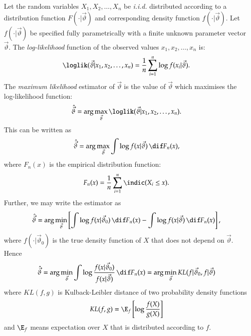 \documentclass[a4paper]{article}
\newcommand{\iid}{\textit{i.i.d.}\xspace}
\numberwithin{equation}{subsection}
\begin{document}
Let the random variables $X_1, X_2, \dots, X_n$ be \iid distributed
according to a distribution function $F(\cdot|\vec{\vartheta})$ and
corresponding density function $
f(\cdot|\vec{\vartheta})$.
Let $f(\cdot|\vec{\vartheta})$ be specified fully parametrically with
a finite unknown parameter vector $\vec{\vartheta}$.  The
\emph{log-likelihood} function of the observed values $x_{1}, x_{2}, \dots,
x_{n}$ is:
\begin{equation}
  \loglik(\vec{\vartheta}|x_1, x_2, \dots, x_n)
  =
  \frac{1}{n}
  \sum_{i=1}^n
  \log f(x_i|\vec{\vartheta}).
\end{equation}
The \emph{maximum likelihood} estimator of $\vec{\vartheta}$ is the
value of $\vec{\vartheta}$ which maximises the log-likelihood
function:
\begin{equation}
  \hat{\vec{\vartheta}}
  =
  \arg \max_{\vec{\vartheta}}
  \loglik(\vec{\vartheta}|x_1, x_2, \dots, x_n).
\end{equation}
This can be written as
\begin{equation}
  \hat{\vec{\vartheta}}
  =
  \arg \max_{\vec{\vartheta}}
  \int \log f(x|\vec{\vartheta}) \,\dif F_n(x),
\end{equation}
where $F_n(x)$ is the empirical distribution function:
\begin{equation}
  F_n(x) 
  =
  \frac{1}{n}
  \sum_{i=1}^n
  \indic(X_i \le x).
\end{equation}
Further, we may write the estimator as
\begin{equation}
  \hat{\vec{\vartheta}}
  =
  \arg \min_{\vec{\vartheta}}
  \left[
    \int \log f(x|\vec{\vartheta}_{0}) \,\dif F_n(x)
    -
    \int \log f(x|\vec{\vartheta}) \,\dif F_n(x)
  \right],
\end{equation}
where $f(\cdot|\vec{\vartheta}_{0})$ is the true density function of
$X$ that does not depend on $\vec{\vartheta}$.  Hence
\begin{equation}
  \hat{\vec{\vartheta}}
  =
  \arg \min_{\vec{\vartheta}}
  \int 
  \log \frac{f(x|\vec{\vartheta}_{0})}{f(x|\vec{\vartheta})} 
  \,\dif F_n(x)
  =
  \arg \min_{\vec{\vartheta}}
  KL(f|\vec{\vartheta}_0, f |\vec{\vartheta})
\end{equation}
where $KL(f,g)$ is Kulback-Leibler distance of two probability density
functions 
\begin{equation}
  KL(f,g) 
  = 
  \E_f 
  \left[
    \log \frac{f(X)}{g(X)}
  \right]
\end{equation}
and $\E_{f}$ means expectation over $X$ that is distributed according
to $f$.
\end{document}
